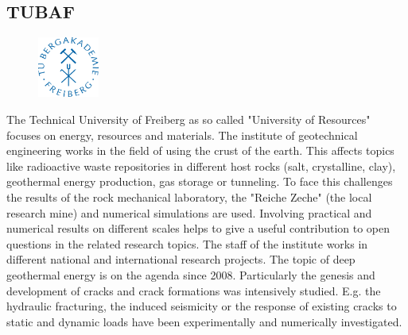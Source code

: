 \subsection{TUBAF}
\begin{figure}
\centering
\includegraphics[width=2cm]{figures/TUBAF_Logo_orig_RGB}
\end{figure}
The Technical University of Freiberg as so called "University of Resources" focuses on energy, resources and materials. The institute of geotechnical engineering works in the field of using the crust of the earth. This affects topics like radioactive waste repositories in different host rocks (salt, crystalline, clay), geothermal energy production, gas storage or tunneling. To face this challenges the results of the rock mechanical laboratory, the "Reiche Zeche" (the local research mine) and numerical simulations are used. Involving practical and numerical results on different scales helps to give a useful contribution to open questions in the related research topics. The staff of the institute works in different national and international research projects. The topic of deep geothermal energy is on the agenda since 2008. Particularly the genesis and development of cracks and crack formations was intensively studied. E.g. the hydraulic fracturing, the induced seismicity or the response of existing cracks to static and dynamic loads have been experimentally and numerically investigated.  


